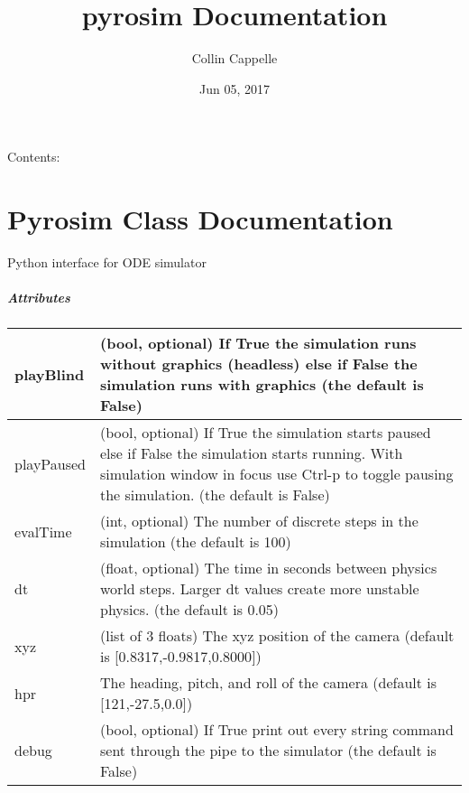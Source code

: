 \documentclass[letterpaper,10pt,english]{sphinxmanual}
\title{pyrosim Documentation}
\date{Jun 05, 2017}
\author{Collin Cappelle}
\begin{document}
\maketitle
\tableofcontents
{}\label{index::doc}


Contents:


\chapter{Pyrosim Class Documentation}
\label{code:pyrosim-class-documentation}\label{code:module-pyrosim}\label{code::doc}\label{code:welcome-to-pyrosim-s-documentation}

\begin{fulllineitems}
\label{code:pyrosim.PYROSIM}
Python interface for ODE simulator
\paragraph{Attributes}

\noindent\begin{tabulary}{\linewidth}{|L|L|}
\hline

playBlind
&
(bool, optional) If True the simulation runs without graphics (headless) else if False the simulation runs with graphics (the default is False)
\\
\hline
playPaused
&
(bool, optional) If True the simulation starts paused else if False the simulation starts running. With simulation window in focus use Ctrl-p to toggle pausing the simulation. (the default is False)
\\
\hline
evalTime
&
(int, optional) The number of discrete steps in the simulation (the default is 100)
\\
\hline
dt
&
(float, optional) The time in seconds between physics world steps. Larger dt values create more unstable physics. (the default is 0.05)
\\
\hline
xyz
&
(list of 3 floats) The xyz position of the camera (default is {[}0.8317,-0.9817,0.8000{]})
\\
\hline
hpr
&
The heading, pitch, and roll of the camera (default is {[}121,-27.5,0.0{]})
\\
\hline
debug
&
(bool, optional) If True print out every string command sent through the pipe to the simulator (the default is False)
\\
\hline\end{tabulary}


\end{fulllineitems}
\end{document}

